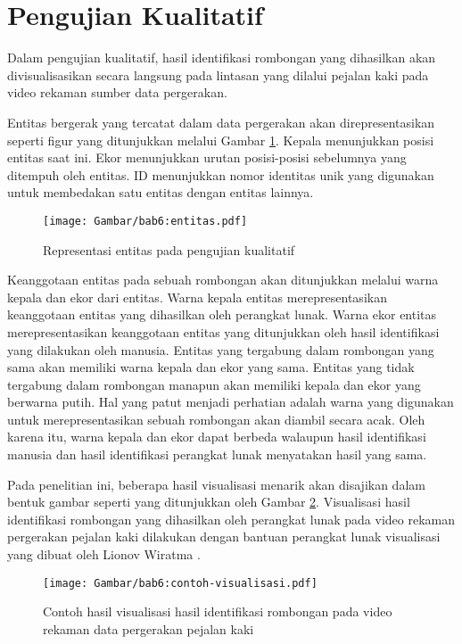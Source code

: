 \section{Pengujian Kualitatif}
\label{sec:qualitative}

Dalam pengujian kualitatif, hasil identifikasi rombongan yang dihasilkan akan divisualisasikan secara langsung pada lintasan yang dilalui pejalan kaki pada video rekaman sumber data pergerakan.

Entitas bergerak yang tercatat dalam data pergerakan akan direpresentasikan seperti figur yang ditunjukkan melalui Gambar \ref{bab6:representasi-entitas}. Kepala menunjukkan posisi entitas saat ini. Ekor menunjukkan urutan posisi-posisi sebelumnya yang ditempuh oleh entitas. ID menunjukkan nomor identitas unik yang digunakan untuk membedakan satu entitas dengan entitas lainnya.

\begin{figure}[t]
    \centering
    \texttt{[image: Gambar/bab6:entitas.pdf]}
    \caption{Representasi entitas pada pengujian kualitatif}
    \label{bab6:representasi-entitas}
\end{figure}

Keanggotaan entitas pada sebuah rombongan akan ditunjukkan melalui warna kepala dan ekor dari entitas. Warna kepala entitas merepresentasikan keanggotaan entitas yang dihasilkan oleh perangkat lunak. Warna ekor entitas merepresentasikan keanggotaan entitas yang ditunjukkan oleh hasil identifikasi yang dilakukan oleh manusia. Entitas yang tergabung dalam rombongan yang sama akan memiliki warna kepala dan ekor yang sama. Entitas yang tidak tergabung dalam rombongan manapun akan memiliki kepala dan ekor yang berwarna putih. Hal yang patut menjadi perhatian adalah warna yang digunakan untuk merepresentasikan sebuah rombongan akan diambil secara acak. Oleh karena itu, warna kepala dan ekor dapat berbeda walaupun hasil identifikasi manusia dan hasil identifikasi perangkat lunak menyatakan hasil yang sama.

Pada penelitian ini, beberapa hasil visualisasi menarik akan disajikan dalam bentuk gambar seperti yang ditunjukkan oleh Gambar \ref{bab6:contoh-visualisasi}. Visualisasi hasil identifikasi rombongan yang dihasilkan oleh perangkat lunak pada video rekaman pergerakan pejalan kaki dilakukan dengan bantuan perangkat lunak visualisasi yang dibuat oleh Lionov Wiratma \cite{wiratma:software}.

\begin{figure}[h]
    \centering
    \captionsetup{width=0.8\textwidth}
    \texttt{[image: Gambar/bab6:contoh-visualisasi.pdf]}
    \caption[Contoh hasil visualisasi rombongan]{Contoh hasil visualisasi hasil identifikasi rombongan pada video rekaman data pergerakan pejalan kaki}
    \label{bab6:contoh-visualisasi}
\end{figure}

